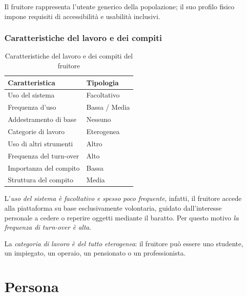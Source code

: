 Il fruitore rappresenta l'utente generico della popolazione; il suo profilo fisico impone requisiti di accessibilità e usabilità inclusivi.

\subsubsection{Caratteristiche del lavoro e dei compiti}
\begin{table}[H]
    \centering
    \begin{tabular}{@{}>{\raggedright\arraybackslash}p{6cm}>{\raggedright\arraybackslash}p{6cm}@{}}
        \toprule
        \textbf{Caratteristica}          & \textbf{Tipologia}                       \\ \midrule
        Uso del sistema                  & Facoltativo                              \\
        Frequenza d'uso                  & Bassa / Media            \\
        Addestramento di base            & Nessuno                                  \\
        Categorie di lavoro              & Eterogenea  \\
        Uso di altri strumenti           & Altro \\
        Frequenza del turn-over          & Alto                                     \\
        Importanza del compito           & Bassa                \\
        Struttura del compito            & Media                                    \\ \bottomrule
    \end{tabular}
    \caption{Caratteristiche del lavoro e dei compiti del fruitore}
\end{table}

L'\emph{uso del sistema è facoltativo e spesso poco frequente}, infatti, il fruitore accede alla piattaforma su base esclusivamente volontaria, guidato dall'interesse personale a cedere o reperire oggetti mediante il baratto. Per questo motivo \emph{la frequenza di turn-over è alta}.

La \emph{categoria di lavoro è del tutto eterogenea}: il fruitore può essere uno studente, un impiegato, un operaio, un pensionato o un professionista.

\section{Persona}
